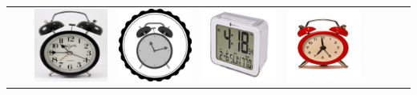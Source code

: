\begin{table}[htbp]
\begin{tabularx}{\textwidth}{lcYYYYYYYY}
       & & \includegraphics[height=\imagequadsize, width=\imagequadsize]{Figures/Chapter2/OfficeHome/OfficeHome_env0Art_1_idx61_class0.png} & \includegraphics[height=\imagequadsize, width=\imagequadsize]{Figures/Chapter2/OfficeHome/OfficeHome_env1Clipart_5_idx24_class0.png} & \includegraphics[height=\imagequadsize, width=\imagequadsize]{Figures/Chapter2/OfficeHome/OfficeHome_env2Product_14_idx67_class0.png} & \includegraphics[height=\imagequadsize, width=\imagequadsize]{Figures/Chapter2/OfficeHome/OfficeHome_env3Real World_44_idx13_class0.png} & &  & & \\

\end{tabularx}
\end{table}
